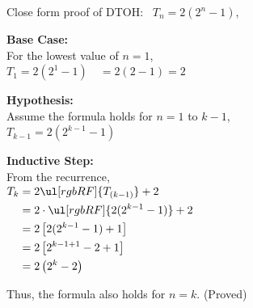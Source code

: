 \begin{minipage}[t]{0.45\textwidth}
   \vspace{0pt} 
   Close form proof of DTOH: \ $T_n = 2 \left(2^n - 1\right)$,

   \vspace{0.5em}
   \textbf{Base Case:}\\[0.5em]
   For the lowest value of $n = 1$,\\[0.5em]
   $T_1 = 2(2^1 - 1) \quad = 2(2 - 1) = 2$
   
   \vspace{1em}
   \textbf{Hypothesis:}\\[0.5em]
   Assume the formula holds for $n = 1$ to $k-1$,\\[0.5em]
   $T_{k-1} = 2(2^{k-1} - 1)$
   
   \vspace{1em}
   \textbf{Inductive Step:}\\[0.5em]
   From the recurrence,\\[0.5em]
   $\begin{aligned}
      T_k & = 2\ul[rgbRF]{T_{(k-1)}} + 2 \\
      &= 2 \cdot \ul[rgbRF]{2(2^{k-1} - 1)} + 2 \\
      &= 2 \left[2(2^{k-1} - 1) + 1\right] \\
      &= 2 \left[2^{k-1+1} - 2 + 1\right] \\
      &= 2 \left(2^k - 2\right)
   \end{aligned}$
   
   \vspace{1em}
   Thus, the formula also holds for $n = k$. (Proved)
\end{minipage}



\pagebreak
